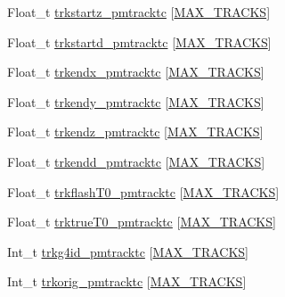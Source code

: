 \begin{DoxyCompactItemize}
\item 
Float\-\_\-t \hyperlink{classanatree_a17bbd9a79203f3eb455b3a71b0fed64a}{trkstartz\-\_\-pmtracktc} \mbox{[}\hyperlink{anatree__core__v09410002_8h_a327fd4e796e4a0d78947524c96e4362e}{M\-A\-X\-\_\-\-T\-R\-A\-C\-K\-S}\mbox{]}
\item 
Float\-\_\-t \hyperlink{classanatree_ae9e94d52eeab80c5aef6a3e53e88ba46}{trkstartd\-\_\-pmtracktc} \mbox{[}\hyperlink{anatree__core__v09410002_8h_a327fd4e796e4a0d78947524c96e4362e}{M\-A\-X\-\_\-\-T\-R\-A\-C\-K\-S}\mbox{]}
\item 
Float\-\_\-t \hyperlink{classanatree_a1af511a02182ee259a0721daa054ad56}{trkendx\-\_\-pmtracktc} \mbox{[}\hyperlink{anatree__core__v09410002_8h_a327fd4e796e4a0d78947524c96e4362e}{M\-A\-X\-\_\-\-T\-R\-A\-C\-K\-S}\mbox{]}
\item 
Float\-\_\-t \hyperlink{classanatree_a0329b01453907face0bc6374ed6480fc}{trkendy\-\_\-pmtracktc} \mbox{[}\hyperlink{anatree__core__v09410002_8h_a327fd4e796e4a0d78947524c96e4362e}{M\-A\-X\-\_\-\-T\-R\-A\-C\-K\-S}\mbox{]}
\item 
Float\-\_\-t \hyperlink{classanatree_a59616b2a2011fe1f367235a0ad23e634}{trkendz\-\_\-pmtracktc} \mbox{[}\hyperlink{anatree__core__v09410002_8h_a327fd4e796e4a0d78947524c96e4362e}{M\-A\-X\-\_\-\-T\-R\-A\-C\-K\-S}\mbox{]}
\item 
Float\-\_\-t \hyperlink{classanatree_a15b080e24776c82776cc0e166872b67c}{trkendd\-\_\-pmtracktc} \mbox{[}\hyperlink{anatree__core__v09410002_8h_a327fd4e796e4a0d78947524c96e4362e}{M\-A\-X\-\_\-\-T\-R\-A\-C\-K\-S}\mbox{]}
\item 
Float\-\_\-t \hyperlink{classanatree_a7af1237cd50841288249923a4abc49fa}{trkflash\-T0\-\_\-pmtracktc} \mbox{[}\hyperlink{anatree__core__v09410002_8h_a327fd4e796e4a0d78947524c96e4362e}{M\-A\-X\-\_\-\-T\-R\-A\-C\-K\-S}\mbox{]}
\item 
Float\-\_\-t \hyperlink{classanatree_a0d8055f03c13fc09fdd485c0e5cdc776}{trktrue\-T0\-\_\-pmtracktc} \mbox{[}\hyperlink{anatree__core__v09410002_8h_a327fd4e796e4a0d78947524c96e4362e}{M\-A\-X\-\_\-\-T\-R\-A\-C\-K\-S}\mbox{]}
\item 
Int\-\_\-t \hyperlink{classanatree_a45ee3f10137fb84a4c65c589e5203d4a}{trkg4id\-\_\-pmtracktc} \mbox{[}\hyperlink{anatree__core__v09410002_8h_a327fd4e796e4a0d78947524c96e4362e}{M\-A\-X\-\_\-\-T\-R\-A\-C\-K\-S}\mbox{]}
\item 
Int\-\_\-t \hyperlink{classanatree_a159bba3972eda8524df8db1fe95a7940}{trkorig\-\_\-pmtracktc} \mbox{[}\hyperlink{anatree__core__v09410002_8h_a327fd4e796e4a0d78947524c96e4362e}{M\-A\-X\-\_\-\-T\-R\-A\-C\-K\-S}\mbox{]}

\end{DoxyCompactItemize}
